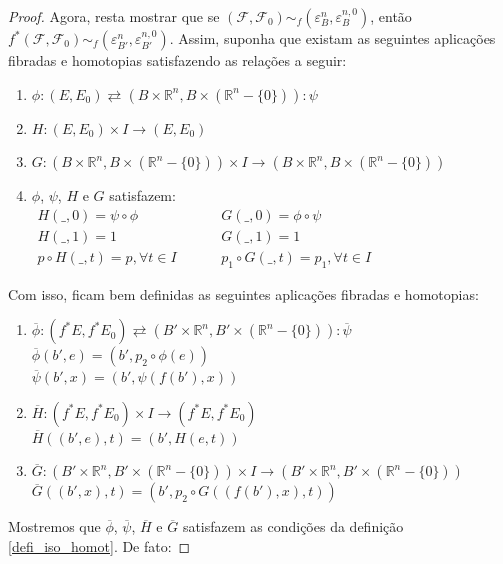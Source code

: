 \documentclass[12pt,oneside]{book} %
\newcommand{\R}{\mathbb{R}}
\begin{document}
\begin{proof}
	\par Agora, resta mostrar que se $(\mathcal{F},\mathcal{F}_{0})\sim_{f}(\varepsilon_{B}^{n},\varepsilon_{B}^{n,0})$, então $f^{*}(\mathcal{F},\mathcal{F}_{0})\sim_{f}(\varepsilon_{B'}^{n},\varepsilon_{B'}^{n,0})$. Assim, suponha que existam as seguintes aplicações fibradas e homotopias satisfazendo as relações a seguir: 
	
	\begin{enumerate}
		\item $\phi:(E,E_{0})\rightleftarrows(B\times \R^{n},B\times (\R^{n}-\{ 0 \})):\psi$
		\item $H:(E,E_{0})\times I\to (E,E_{0})$
		\item $G:(B\times\R^{n},B\times(\R^{n}-\{ 0 \}))\times I\to (B\times\R^{n},B\times(\R^{n}-\{ 0 \}))$
		\item $\phi$, $\psi$, $H$ e $G$ satisfazem:
		$\begin{array}{lcccl}
			H(\_,0)=\psi\circ\phi            & & & & G(\_,0)=\phi\circ\psi \\
			H(\_,1)=1                        & & & & G(\_,1)=1 \\
			p\circ H(\_,t)=p, \forall t\in I & & & & p_{1}\circ G(\_,t)=p_{1}, \forall t\in I
		\end{array}$	
	\end{enumerate}
	
	\par Com isso, ficam bem definidas as seguintes aplicações fibradas e homotopias:
	
	\begin{enumerate}
		\item $\overline{\phi}:(f^{*}E,f^{*}E_{0})\rightleftarrows (B'\times \R^{n},B'\times (\R^{n}-\{ 0 \})):\overline{\psi}$ \\
		$ \overline{\phi}(b',e)=(b',p_{2}\circ\phi(e)) $ \\
		$ \overline{\psi}(b',x)=(b',\psi(f(b'),x)) $
		\item $\overline{H}:(f^{*}E,f^{*}E_{0})\times I\to (f^{*}E,f^{*}E_{0})$ \\
		$ \overline{H}((b',e),t)=(b',H(e,t)) $
		\item $\overline{G}:(B'\times \R^{n},B'\times (\R^{n}-\{ 0 \}))\times I\to (B'\times \R^{n},B'\times (\R^{n}-\{ 0 \}))$ \\
		$ \overline{G}((b',x),t)=(b',p_{2}\circ G((f(b'),x),t)) $
	\end{enumerate}
	
	\par Mostremos que $\overline{\phi}$, $\overline{\psi}$, $\overline{H}$ e $\overline{G}$ satisfazem as condições da definição \ref{defi_iso_homot}. De fato:
	

\end{proof}
\end{document}
